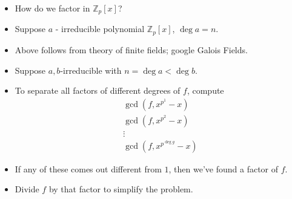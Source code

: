 \begin{frame}
\begin{itemize}
\item How do we factor in $\mathbb Z_p[x]$?
\item<2-> Suppose $a$ - irreducible polynomial $\mathbb Z_p[x]$, $\deg a=n$. 
\item<4-> Above follows from theory of finite fields; google Galois Fields.
\item<5-> Suppose $a,b$-irreducible with $n=\deg a<\deg b$. 
\item<7-> To separate all factors of different degrees of $f$, compute 
\[
\begin{array}{c}
\gcd(f, x^{p^{1}}-x)\\
\gcd(f, x^{p^{2}}-x)\\
\vdots\\
\gcd(f, x^{p^{\deg g}}- x)
\end{array}
\]
\item<8-> If any of these comes out different from $1$, then we've found a factor of $f$. 
\item<9-> Divide $f$ by that factor to simplify the problem.
\end{itemize}

\end{frame}